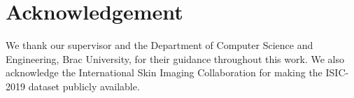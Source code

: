 \section*{Acknowledgement}

We thank our supervisor and the Department of Computer Science and Engineering,
Brac University, for their guidance throughout this work. We also acknowledge
the International Skin Imaging Collaboration for making the ISIC-2019 dataset
publicly available.

\pagebreak
